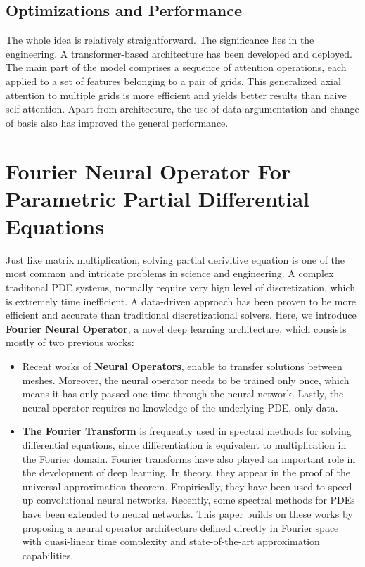 \documentclass[conference]{IEEEtran}
\begin{document}
\subsection{Optimizations and Performance}
The whole idea is relatively straightforward. The significance lies in the engineering. A transformer-based\cite{b7} architecture has been developed and deployed. The main part of
the model comprises a sequence of attention operations, each applied to a set of features belonging to a pair of grids. This generalized axial attention\cite{b8} to multiple grids is more efficient and yields better results than naive self-attention. Apart from architecture, the use of data argumentation and change of basis also has improved the general performance.


\section{Fourier Neural Operator For Parametric Partial Differential Equations}
Just like matrix multiplication, solving partial derivitive equation is one of the most common and intricate problems in science and engineering. A complex traditonal PDE systems, normally require very hign level of discretization, which is extremely time inefficient. A data-driven approach has been proven to be more efficient and accurate than traditional discretizational solvers. Here, we introduce \textbf{Fourier Neural Operator}\cite{b9}, a novel deep learning architecture, which consists mostly of two previous works:
\begin{itemize}
\item Recent works of \textbf{Neural Operators}\cite{b10,b11,b12,b13,b14}, enable to transfer solutions between meshes. Moreover, the neural operator needs to be trained only once, which means it has only passed one time through the neural network. Lastly, the neural operator requires no knowledge of the underlying PDE, only data.
\item \textbf{The Fourier Transform} is frequently used in spectral methods for solving differential equations, since differentiation is equivalent to multiplication in the Fourier domain. Fourier transforms have also played an important role in the development of deep learning. In theory, they appear in the proof of the universal approximation theorem\cite{b15}. Empirically, they have been used to speed up convolutional neural networks\cite{b16}. Recently, some spectral methods for PDEs\cite{b17,b18} have been extended to neural networks. This paper builds on these works by proposing a neural operator architecture defined directly in Fourier space with quasi-linear time complexity and state-of-the-art approximation capabilities.

\end{itemize}
\end{document}
